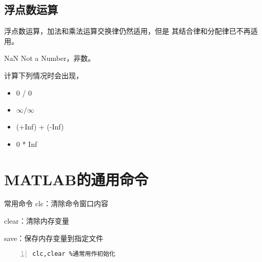 \subsection{浮点数运算}
浮点数运算，加法和乘法运算交换律仍然适用，但是
其结合律和分配律已不再适用。
\begin{definition}{NaN}{}
 Not a Number，非数。
\end{definition}

计算下列情况时会出现，

\begin{itemize}
  \item 0 / 0
  \item $\infty / \infty$
  \item (+Inf) + (-Inf)
  \item 0 * Inf
\end{itemize}
\section{MATLAB的通用命令}
\begin{definition}{常用命令}{}
 clc：清除命令窗口内容
 
 clear：清除内存变量
 
 save：保存内存变量到指定文件
\end{definition}

\begin{lstlisting}[frame=single,numbers=left]
clc,clear %通常用作初始化
\end{lstlisting}